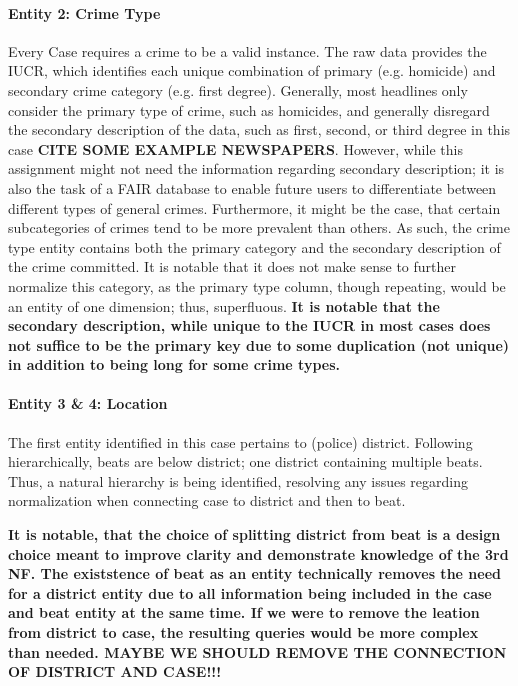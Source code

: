 \documentclass[a4paper]{article}
\begin{document}
\paragraph{Entity 2: Crime Type} Every Case requires a crime to be a valid instance. The raw data provides the IUCR, which identifies each unique combination of primary (e.g. homicide) and secondary crime category (e.g. first degree). Generally, most headlines only consider the primary type of crime, such as homicides, and generally disregard the secondary description of the data, such as first, second, or third degree in this case \textbf{CITE SOME EXAMPLE NEWSPAPERS}. However, while this assignment might not need the information regarding secondary description; it is also the task of a FAIR database to enable future users to differentiate between different types of general crimes. Furthermore, it might be the case, that certain subcategories of crimes tend to be more prevalent than others. As such, the crime type entity contains both the primary category and the secondary description of the crime committed. It is notable that it does not make sense to further normalize this category, as the primary type column, though repeating, would be an entity of one dimension; thus, superfluous. \textbf{It is notable that the secondary description, while unique to the IUCR in most cases does not suffice to be the primary key due to some duplication (not unique) in addition to being long for some crime types.}


\paragraph{Entity 3 \& 4: Location} 
The first entity identified in this case pertains to (police) district. Following hierarchically, beats are below district; one district containing multiple beats. Thus, a natural hierarchy is being identified, resolving any issues regarding normalization when connecting case to district and then to beat. 

\textbf{It is notable, that the choice of splitting district from beat is a design choice meant to improve clarity and demonstrate knowledge of the 3rd NF. The existstence of beat as an entity technically removes the need for a district entity due to all information being included in the case and beat entity at the same time. If we were to remove the leation from district to case, the resulting queries would be more complex than needed.
MAYBE WE SHOULD REMOVE THE CONNECTION OF DISTRICT AND CASE!!!}
\end{document}
